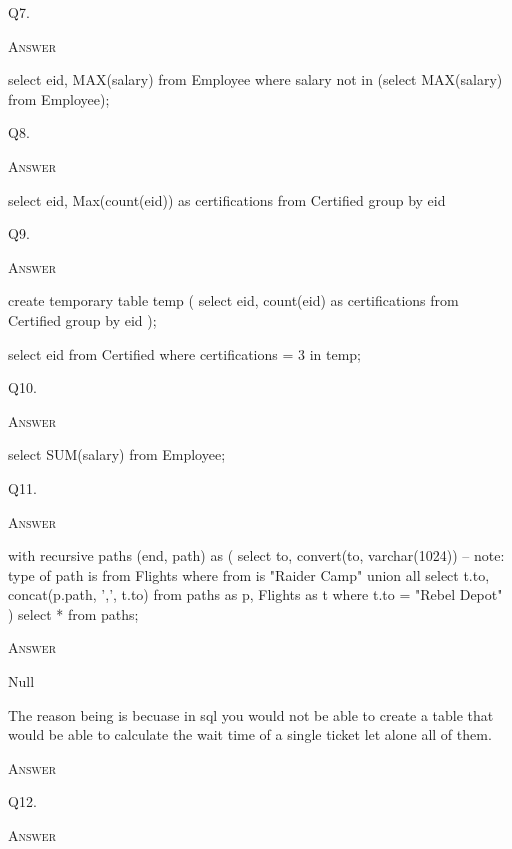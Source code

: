 \newpage

Q7. 

\textsc{Answer}
\begin{answercode}
  select eid, MAX(salary) from Employee where 
  salary not in (select MAX(salary) from Employee);
\end{answercode}


Q8. 

\textsc{Answer}
\begin{answercode}
select eid, Max(count(eid)) as certifications from Certified group by eid
\end{answercode}


\newpage
Q9. 

\textsc{Answer}
\begin{answercode}
create temporary table temp
(
  select eid, count(eid) as certifications from Certified group by eid
);

select eid from Certified where certifications = 3 in temp;
\end{answercode}


Q10. 

\textsc{Answer}
\begin{answercode}
select SUM(salary) from Employee;
\end{answercode}


\newpage
Q11. 

\textsc{Answer}
\begin{answercode}
  with recursive paths (end, path) as
  (
    select to, convert(to, varchar(1024)) -- note: type of path is
      from Flights
      where from is "Raider Camp"
    union all
    select t.to, concat(p.path, ',', t.to)
      from paths as p, Flights as t
      where t.to = "Rebel Depot"
  )
  select * from paths;
  
\end{answercode}


\newpage



\newpage


\textsc{Answer}
\begin{answercode}
Null

The reason being is becuase in sql you would not be able 
to create a table that would be able to calculate the 
wait time of a single ticket let alone all of them.
\end{answercode}




\newpage


\textsc{Answer}
\begin{answercode}

\end{answercode}


\newpage
Q12. 

\textsc{Answer}
\begin{answercode}

\end{answercode}


